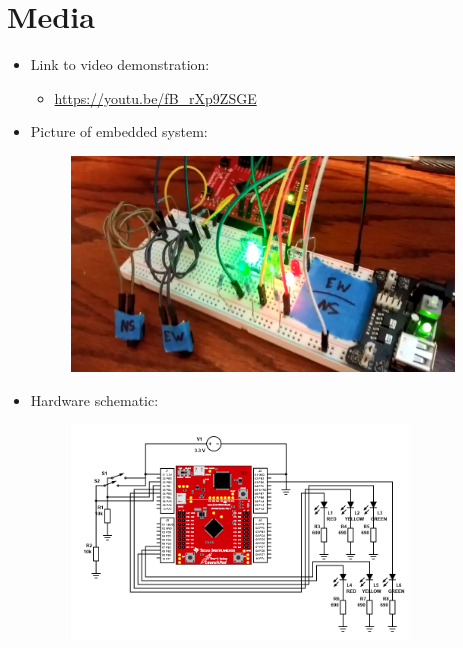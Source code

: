 \documentclass{article}
\begin{document}
\section{Media}
\begin{itemize}
    \item Link to video demonstration:
    \begin{itemize}
        \item \url{https://youtu.be/fB_rXp9ZSGE}
    \end{itemize}
    \item Picture of embedded system:
    \begin{figure}[H]
        \centering
        \includegraphics[height=162pt]{Images/embeddedsystem}
    \end{figure}
    \item Hardware schematic:
    \begin{figure}[H]
        \centering
        \includegraphics[height=162pt]{Images/schemeit-project}
    \end{figure}
\end{itemize}
\end{document}
